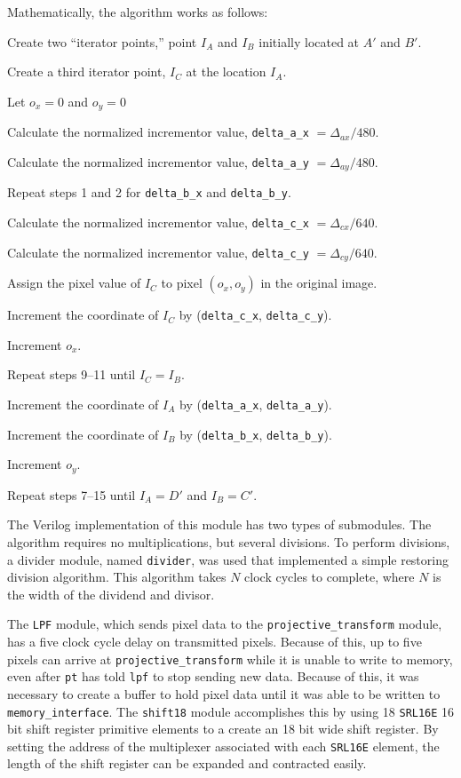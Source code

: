 \documentclass[10pt]{article}
\begin{document}
Mathematically, the algorithm works as follows:
\begin{enumerate*}
\item Create two ``iterator points,'' point $I_A$ and $I_B$ initially located at $A\prime$ and $B\prime$.
\item Create a third iterator point, $I_C$ at the location $I_A$.
\item Let $o_x = 0$ and $o_y = 0$

\item Calculate the normalized incrementor value, {\tt delta\_a\_x} $= \Delta_{ax}/480$.
\item Calculate the normalized incrementor value, {\tt delta\_a\_y} $= \Delta_{ay}/480$.
\item Repeat steps 1 and 2 for {\tt delta\_b\_x} and {\tt delta\_b\_y}.
\item Calculate the normalized incrementor value, {\tt delta\_c\_x} $= \Delta_{cx}/640$.
\item Calculate the normalized incrementor value, {\tt delta\_c\_y} $= \Delta_{cy}/640$.

\item Assign the pixel value of $I_C$ to pixel $(o_x, o_y)$ in the original image.
\item Increment the coordinate of $I_C$ by ({\tt delta\_c\_x}, {\tt delta\_c\_y}).
\item Increment $o_x$.
\item Repeat steps 9--11 until $I_C = I_B$.

\item Increment the coordinate of $I_A$ by ({\tt delta\_a\_x}, {\tt delta\_a\_y}).
\item Increment the coordinate of $I_B$ by ({\tt delta\_b\_x}, {\tt delta\_b\_y}).
\item Increment $o_y$.
\item Repeat steps 7--15 until $I_A = D\prime$ and $I_B = C\prime$.

\end{enumerate*}

The Verilog implementation of this module has two types of submodules. The algorithm requires no multiplications, but several divisions. To perform divisions, a divider module, named {\tt divider}, was used that implemented a simple restoring division algorithm. \cite{restoring} This algorithm takes $N$ clock cycles to complete, where $N$ is the width of the dividend and divisor.

The {\tt LPF} module, which sends pixel data to the {\tt projective\_transform} module, has a five clock cycle delay on transmitted pixels. Because of this, up to five pixels can arrive at {\tt projective\_transform} while it is unable to write to memory, even after {\tt pt} has told {\tt lpf} to stop sending new data. Because of this, it was necessary to create a buffer to hold pixel data until it was able to be written to {\tt memory\_interface}. The {\tt shift18} module accomplishes this by using 18 {\tt SRL16E} 16 bit shift register primitive elements to a create an 18 bit wide shift register. By setting the address of the multiplexer associated with each {\tt SRL16E} element, the length of the shift register can be expanded and contracted easily.
\end{document}
